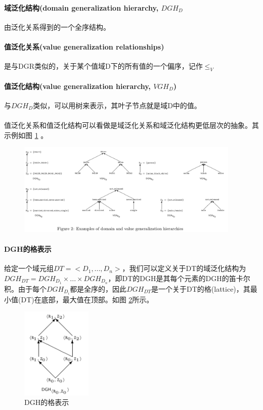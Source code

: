 \documentclass[12pt,a4paper]{article}
\begin{document}
\paragraph{域泛化结构(domain generalization hierarchy, $DGH_D$} 由泛化关系得到的一个全序结构。
\paragraph{值泛化关系(value generalization relationships)} 是与DGR类似的，关于某个值域D下的所有值的一个偏序，记作$ \leq_V$
\paragraph{值泛化结构(value generalization hierarchy, $VGH_D$)} 与$DGH_D$类似，可以用树来表示，其叶子节点就是域D中的值。
\paragraph{} 值泛化关系和值泛化结构可以看做是域泛化关系和域泛化结构更低层次的抽象。其示例如图 \ref{dgh-vgh} 。
\begin{figure}[H]
	\centering
	\includegraphics[width=0.95\textwidth]{../images/dgh-vgh.png}
	\caption{}
	\label{dgh-vgh}
\end{figure}
\paragraph{DGH的格表示} 给定一个域元组$DT=<D_1,...,D_n>$，我们可以定义关于DT的域泛化结构为$DGH_{DT}=DGH_{D_1} \times ... \times DGH_{D_n}$，即DT的DGH是其每个元素的DGH的笛卡尔积。由于每个$DGH_{D_i}$都是全序的，因此$DGH_{DT}$是一个关于DT的格(lattice)，其最小值(DT)在底部，最大值在顶部。如图 \ref{dgh-lattice}所示。
\begin{figure}[H]
	\centering
	\includegraphics[width=0.3\textwidth]{../images/dgh-lattice.png}
	\caption{DGH的格表示}
	\label{dgh-lattice}
\end{figure}
\end{document}
